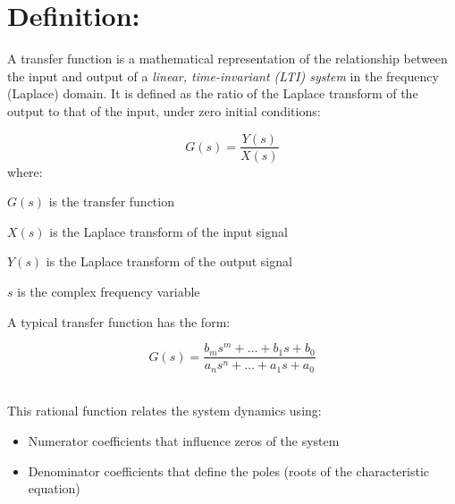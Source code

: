 \documentclass{report}
\begin{document}
\section{Definition:}
A transfer function is a mathematical representation of the relationship between the input and output of a \textit{linear, time-invariant (LTI) system} in the frequency (Laplace) domain. It is defined as the ratio of the Laplace transform of the output to that of the input, under zero initial conditions:

\begin{equation}
    G(s) = \frac{Y(s)}{X(s)}
\end{equation}
where:

$G(s)$ is the transfer function

$X(s)$ is the Laplace transform of the input signal

$Y(s)$ is the Laplace transform of the output signal

$s$ is the complex frequency variable 

\par
A typical transfer function has the form:

\begin{equation}
    G(s) = \frac{b_m s^m + \dots + b_1 s + b_0}{a_n s^n + \dots + a_1 s + a_0}
\end{equation}
\\
\par
This rational function relates the system dynamics using:

\begin{itemize}
    \item Numerator coefficients that influence zeros of the system
    \item Denominator coefficients that define the poles (roots of the characteristic equation)
\end{itemize}
\end{document}
